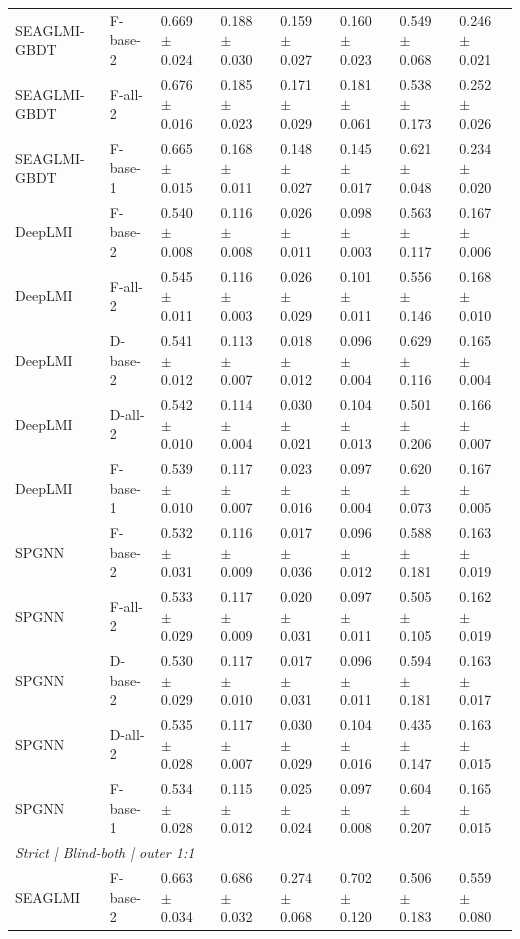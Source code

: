 \begin{landscape}
{\begin{longtable}{llllllll}
SEAGLMI-GBDT & F-base-2 & 0.669 $\pm$ 0.024 & 0.188 $\pm$ 0.030 & 0.159 $\pm$ 0.027 & 0.160 $\pm$ 0.023 & 0.549 $\pm$ 0.068 & 0.246 $\pm$ 0.021 \\
SEAGLMI-GBDT & F-all-2 & 0.676 $\pm$ 0.016 & 0.185 $\pm$ 0.023 & 0.171 $\pm$ 0.029 & 0.181 $\pm$ 0.061 & 0.538 $\pm$ 0.173 & 0.252 $\pm$ 0.026 \\
SEAGLMI-GBDT & F-base-1 & 0.665 $\pm$ 0.015 & 0.168 $\pm$ 0.011 & 0.148 $\pm$ 0.027 & 0.145 $\pm$ 0.017 & 0.621 $\pm$ 0.048 & 0.234 $\pm$ 0.020 \\
DeepLMI & F-base-2 & 0.540 $\pm$ 0.008 & 0.116 $\pm$ 0.008 & 0.026 $\pm$ 0.011 & 0.098 $\pm$ 0.003 & 0.563 $\pm$ 0.117 & 0.167 $\pm$ 0.006 \\
DeepLMI & F-all-2 & 0.545 $\pm$ 0.011 & 0.116 $\pm$ 0.003 & 0.026 $\pm$ 0.029 & 0.101 $\pm$ 0.011 & 0.556 $\pm$ 0.146 & 0.168 $\pm$ 0.010 \\
DeepLMI & D-base-2 & 0.541 $\pm$ 0.012 & 0.113 $\pm$ 0.007 & 0.018 $\pm$ 0.012 & 0.096 $\pm$ 0.004 & 0.629 $\pm$ 0.116 & 0.165 $\pm$ 0.004 \\
DeepLMI & D-all-2 & 0.542 $\pm$ 0.010 & 0.114 $\pm$ 0.004 & 0.030 $\pm$ 0.021 & 0.104 $\pm$ 0.013 & 0.501 $\pm$ 0.206 & 0.166 $\pm$ 0.007 \\
DeepLMI & F-base-1 & 0.539 $\pm$ 0.010 & 0.117 $\pm$ 0.007 & 0.023 $\pm$ 0.016 & 0.097 $\pm$ 0.004 & 0.620 $\pm$ 0.073 & 0.167 $\pm$ 0.005 \\
SPGNN & F-base-2 & 0.532 $\pm$ 0.031 & 0.116 $\pm$ 0.009 & 0.017 $\pm$ 0.036 & 0.096 $\pm$ 0.012 & 0.588 $\pm$ 0.181 & 0.163 $\pm$ 0.019 \\
SPGNN & F-all-2 & 0.533 $\pm$ 0.029 & 0.117 $\pm$ 0.009 & 0.020 $\pm$ 0.031 & 0.097 $\pm$ 0.011 & 0.505 $\pm$ 0.105 & 0.162 $\pm$ 0.019 \\
SPGNN & D-base-2 & 0.530 $\pm$ 0.029 & 0.117 $\pm$ 0.010 & 0.017 $\pm$ 0.031 & 0.096 $\pm$ 0.011 & 0.594 $\pm$ 0.181 & 0.163 $\pm$ 0.017 \\
SPGNN & D-all-2 & 0.535 $\pm$ 0.028 & 0.117 $\pm$ 0.007 & 0.030 $\pm$ 0.029 & 0.104 $\pm$ 0.016 & 0.435 $\pm$ 0.147 & 0.163 $\pm$ 0.015 \\
SPGNN & F-base-1 & 0.534 $\pm$ 0.028 & 0.115 $\pm$ 0.012 & 0.025 $\pm$ 0.024 & 0.097 $\pm$ 0.008 & 0.604 $\pm$ 0.207 & 0.165 $\pm$ 0.015 \\
\multicolumn{8}{l}{\textit{Strict | Blind-both | outer 1:1}}\\
SEAGLMI & F-base-2 & 0.663 $\pm$ 0.034 & 0.686 $\pm$ 0.032 & 0.274 $\pm$ 0.068 & 0.702 $\pm$ 0.120 & 0.506 $\pm$ 0.183 & 0.559 $\pm$ 0.080 \\

\end{longtable}}
\end{landscape}
